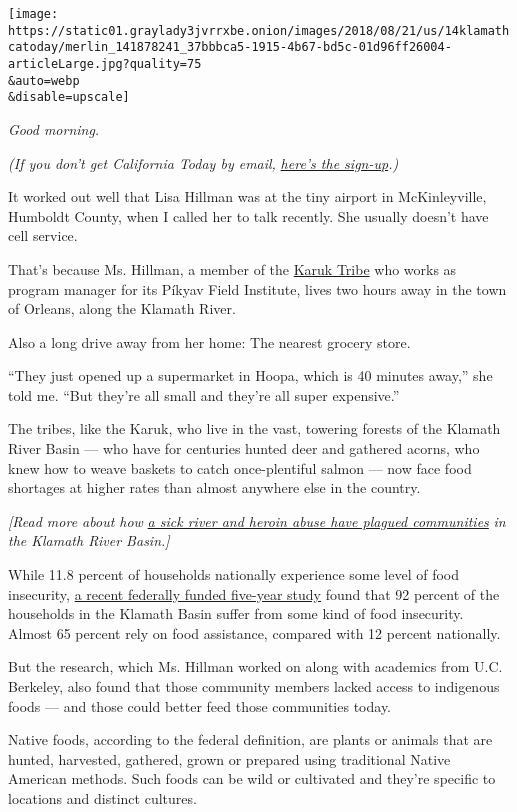 \texttt{[image: https://static01.graylady3jvrrxbe.onion/images/2018/08/21/us/14klamathcatoday/merlin\_141878241\_37bbbca5-1915-4b67-bd5c-01d96ff26004-articleLarge.jpg?quality=75\\\&auto=webp\\\&disable=upscale]}

\emph{Good morning.}

\emph{(If you don't get California Today by email,}
\href{https://www.nytimes3xbfgragh.onion/newsletters/california-today}{\emph{here's
the sign-up}}\emph{.)}

It worked out well that Lisa Hillman was at the tiny airport in
McKinleyville, Humboldt County, when I called her to talk recently. She
usually doesn't have cell service.

That's because Ms. Hillman, a member of the
\href{http://www.karuk.us/}{Karuk Tribe} who works as program manager
for its Píkyav Field Institute, lives two hours away in the town of
Orleans, along the Klamath River.

Also a long drive away from her home: The nearest grocery store.

``They just opened up a supermarket in Hoopa, which is 40 minutes
away,'' she told me. ``But they're all small and they're all super
expensive.''

The tribes, like the Karuk, who live in the vast, towering forests of
the Klamath River Basin --- who have for centuries hunted deer and
gathered acorns, who knew how to weave baskets to catch once-plentiful
salmon --- now face food shortages at higher rates than almost anywhere
else in the country.

\emph{{[}Read more about how}
\href{https://www.nytimes3xbfgragh.onion/2018/09/04/us/klamath-river-california-tribes-heroin.html}{\emph{a
sick river and heroin abuse have plagued communities}} \emph{in the
Klamath River Basin.{]}}

While 11.8 percent of households nationally experience some level of
food insecurity,
\href{https://link.springer.com/article/10.1007/s12571-019-00925-y}{a
recent federally funded five-year study} found that 92 percent of the
households in the Klamath Basin suffer from some kind of food
insecurity. Almost 65 percent rely on food assistance, compared with 12
percent nationally.

But the research, which Ms. Hillman worked on along with academics from
U.C. Berkeley, also found that those community members lacked access to
indigenous foods --- and those could better feed those communities
today.

Native foods, according to the federal definition, are plants or animals
that are hunted, harvested, gathered, grown or prepared using
traditional Native American methods. Such foods can be wild or
cultivated and they're specific to locations and distinct cultures.

